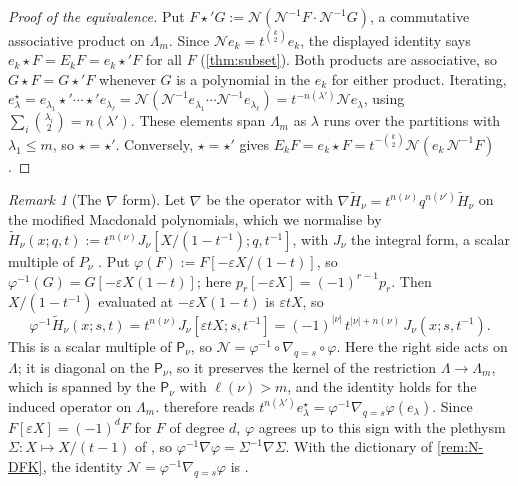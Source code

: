\documentclass[11pt]{amsart}
\theoremstyle{definition}
\theoremstyle{remark}
\newtheorem{remark}[theorem]{Remark}
\numberwithin{equation}{section}
\newcommand{\Lam}{\Lambda}
\begin{document}
\begin{proof}[Proof of the equivalence]
Put $F\star'G:=\mathcal N(\mathcal N^{-1}F\cdot\mathcal N^{-1}G)$, a commutative associative product on $\Lam_m$. Since $\mathcal N e_k=t^{\binom k2}e_k$, the displayed identity says $e_k\star F=E_kF=e_k\star'F$ for all $F$ (\cref{thm:subset}). Both products are associative, so $G\star F=G\star'F$ whenever $G$ is a polynomial in the $e_k$ for either product. Iterating, $e^\star_\lambda=e_{\lambda_1}\star'\cdots\star'e_{\lambda_\ell}=\mathcal N(\mathcal N^{-1}e_{\lambda_1}\cdots\mathcal N^{-1}e_{\lambda_\ell})=t^{-n(\lambda')}\mathcal Ne_\lambda$, using $\sum_i\binom{\lambda_i}2=n(\lambda')$. These elements span $\Lam_m$ as $\lambda$ runs over the partitions with $\lambda_1\le m$, so $\star=\star'$. Conversely, $\star=\star'$ gives $E_kF=e_k\star F=t^{-\binom k2}\mathcal N(e_k\,\mathcal N^{-1}F)$.
\end{proof}

\begin{remark}[The $\nabla$ form]\label{rem:N-nabla}
Let $\nabla$ be the operator with $\nabla\widetilde H_\nu=t^{n(\nu)}q^{n(\nu')}\widetilde H_\nu$ on the modified Macdonald polynomials, which we normalise by $\widetilde H_\nu(x;q,t):=t^{n(\nu)}J_\nu[X/(1-t^{-1});q,t^{-1}]$, with $J_\nu$ the integral form, a scalar multiple of $P_\nu$ \cite[VI \S8]{Macdonald95}. Put $\varphi(F):=F[-\varepsilon X/(1-t)]$, so $\varphi^{-1}(G)=G[-\varepsilon X(1-t)]$; here $p_r[-\varepsilon X]=(-1)^{r-1}p_r$. Then $X/(1-t^{-1})$ evaluated at $-\varepsilon X(1-t)$ is $\varepsilon tX$, so
\[ \varphi^{-1}\widetilde H_\nu(x;s,t)=t^{n(\nu)}J_\nu[\varepsilon tX;s,t^{-1}]=(-1)^{|\nu|}\,t^{|\nu|+n(\nu)}\,J_\nu(x;s,t^{-1}) . \]
This is a scalar multiple of $\mathsf P_\nu$, so $\mathcal N=\varphi^{-1}\circ\nabla_{q=s}\circ\varphi$. Here the right side acts on $\Lam$; it is diagonal on the $\mathsf P_\nu$, so it preserves the kernel of the restriction $\Lam\to\Lam_m$, which is spanned by the $\mathsf P_\nu$ with $\ell(\nu)>m$, and the identity holds for the induced operator on $\Lam_m$.  therefore reads $t^{n(\lambda')}e^\star_\lambda=\varphi^{-1}\nabla_{q=s}\varphi(e_\lambda)$. Since $F[\varepsilon X]=(-1)^dF$ for $F$ of degree $d$, $\varphi$ agrees up to this sign with the plethysm $\Sigma\colon X\mapsto X/(t-1)$ of \cite[Thm.~4.7]{DFK19}, so $\varphi^{-1}\nabla\varphi=\Sigma^{-1}\nabla\Sigma$. With the dictionary of \cref{rem:N-DFK}, the identity $\mathcal N=\varphi^{-1}\nabla_{q=s}\varphi$ is \cite[Rem.~4.8]{DFK19}.
\end{remark}
\end{document}
